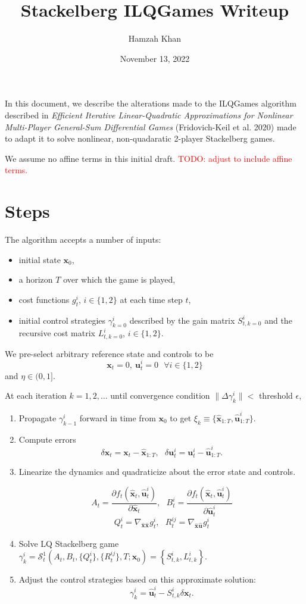 \documentclass[11pt]{article}
\title{Stackelberg ILQGames Writeup}
\author{Hamzah Khan} \date{November 13, 2022}
\newcommand\dd[2]{\frac{\partial#1}{\partial#2}}
\newcommand\truestate[1]{\bm{x}_{#1}}
\newcommand\stack[2]{\mathcal{S}^{#1}_{#2}}
\newcommand\ctrl[2]{\bm{u}^{#1}_{#2}}
\newcommand\horizon{T}
\newcommand\stackmeas[2]{\bm{\hat{x}}^{#1}_{#2}}
\newcommand\ctrlhat[2]{\bm{\hat{u}}^{#1}_{#2}}
\newcommand\todo[1]{\textcolor{red}{TODO: #1}}
\begin{document}
\maketitle

In this document, we describe the alterations made to the ILQGames algorithm described in \emph{Efficient Iterative Linear-Quadratic Approximations for Nonlinear Multi-Player General-Sum Differential Games} (Fridovich-Keil et al. 2020) made to adapt it to solve nonlinear, non-quadaratic 2-player Stackelberg games.

We assume no affine terms in this initial draft. \todo{adjust to include affine terms.}

\section{Steps}
The algorithm accepts a number of inputs:
\begin{itemize}
\item initial state $\truestate{0}$,
\item a horizon $\horizon$ over which the game is played,
\item cost functions $g^i_t$, $i \in \{1, 2\}$ at each time step $t$,
\item initial control strategies $\gamma^i_{k=0}$ described by the gain matrix $S^i_{t, k=0}$ and the recursive cost matrix $L^i_{t, k=0}$, $i \in \{1, 2\}$.
\end{itemize}

We pre-select arbitrary reference state and controls to be
\[ \truestate{t} = 0, ~ \ctrl{i}{t} = 0 ~~~ \forall i \in \{ 1, 2 \} \]
and $\eta \in (0, 1]$.

At each iteration $k = 1, 2, \ldots$ until convergence condition $\| \Delta \gamma^i_{k} \| < $ threshold $\epsilon$,
\begin{enumerate}
\item Propagate $\gamma^i_{k-1}$ forward in time from $\truestate{0}$ to get $\xi_k \equiv \{ \stackmeas{}{1:\horizon}, \ctrlhat{i}{1:\horizon} \}$.

\item Compute errors
\[ \delta \truestate{t} = \truestate{t} - \stackmeas{}{1:\horizon}, ~~~ \delta \ctrl{i}{t} = \ctrl{i}{t} -  \ctrlhat{i}{1:\horizon}. \]

\item Linearize the dynamics and quadraticize about the error state and controls.

\[ A_t = \dd{f_t(\stackmeas{}{t}, \ctrlhat{i}{t})}{\stackmeas{}{t}}, ~~~ B^i_t = \dd{f_t(\stackmeas{}{t}, \ctrlhat{i}{t})}{\ctrlhat{i}{t}} \]
\[ Q^i_t = \nabla_{\stackmeas{}{}\stackmeas{}{}} g^i_t, ~~~ R^{ij}_t = \nabla_{\stackmeas{}{}\ctrlhat{}{}} g^i_t \]

\item Solve LQ Stackelberg game $\gamma^i_{k} = \stack{1}{t}(A_t, B_t, \{ Q^i_t \}, \{ R^{ij}_t \}, \horizon; \truestate{0}) = \left\{ S^i_{t, k}, L^i_{t, k} \right\}$.

\item Adjust the control strategies based on this approximate solution:
\[ \gamma^i_k = \ctrlhat{i}{t} - S^i_{t, k} \delta\truestate{t}.  \]
\end{enumerate}
\end{document}
